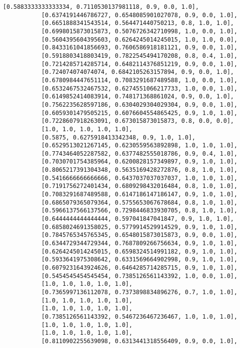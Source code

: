 \documentclass[11pt]{article}
\begin{document}
\begin{Verbatim}[commandchars=\\\{\}]
           [0.5883333333333334, 0.7110530137981118, 0.9, 0.0, 1.0],
           [0.6374191446786727, 0.6548085901027078, 0.9, 0.0, 1.0],
           [0.6651888341543514, 0.564471440750213, 0.8, 1.0, 1.0],
           [0.6998015873015873, 0.5076726342710998, 1.0, 0.0, 1.0],
           [0.5604395604395603, 0.6264245014245015, 1.0, 1.0, 0.0],
           [0.8433161041856693, 0.7606586918181121, 0.9, 0.0, 1.0],
           [0.5918803418803419, 0.7822545494170208, 0.8, 0.4, 1.0],
           [0.7214285714285714, 0.6482114376851219, 0.9, 0.0, 1.0],
           [0.724074074074074, 0.6842105263157894, 0.9, 0.0, 1.0],
           [0.6780984447651114, 0.7083291687489588, 1.0, 0.0, 1.0],
           [0.6532467532467532, 0.6274551066217733, 1.0, 0.0, 1.0],
           [0.6149852414083914, 0.748171368861024, 0.9, 0.0, 1.0],
           [0.7562235628597186, 0.6304029304029304, 0.9, 0.0, 1.0],
           [0.6059301479505215, 0.6076604554865425, 0.9, 1.0, 1.0],
           [0.7228607918263091, 0.673015873015873, 0.8, 0.0, 0.0],
           [1.0, 1.0, 1.0, 1.0, 1.0],
           [0.5875, 0.6275918413342348, 0.9, 1.0, 1.0],
           [0.6529513021267145, 0.6230559563892898, 1.0, 1.0, 1.0],
           [0.7743464052287582, 0.6377482555018786, 0.9, 0.4, 1.0],
           [0.7030701754385964, 0.6200828157349897, 0.9, 1.0, 1.0],
           [0.8065217391304348, 0.5635169428272876, 0.8, 1.0, 1.0],
           [0.5416666666666666, 0.6437037037037037, 1.0, 1.0, 1.0],
           [0.7191756272401434, 0.6809298432016484, 0.8, 1.0, 1.0],
           [0.7083291687489588, 0.6147186147186147, 0.9, 1.0, 1.0],
           [0.6865079365079364, 0.5755653067678684, 0.8, 1.0, 1.0],
           [0.5966137566137566, 0.7298446833930705, 0.8, 1.0, 1.0],
           [0.6444444444444444, 0.597041847041847, 0.9, 1.0, 1.0],
           [0.6858024691358025, 0.5779914529914529, 0.9, 1.0, 1.0],
           [0.7845765345765345, 0.6548015873015873, 0.9, 0.0, 1.0],
           [0.6344729344729344, 0.7687809266756634, 0.9, 1.0, 1.0],
           [0.6264245014245015, 0.6598324514991182, 0.9, 1.0, 1.0],
           [0.5933641975308642, 0.6331569664902998, 0.9, 1.0, 1.0],
           [0.6079231643924626, 0.6464285714285715, 0.9, 1.0, 1.0],
           [0.5454545454545454, 0.7385126561143392, 1.0, 0.0, 1.0],
           [1.0, 1.0, 1.0, 1.0, 1.0],
           [0.7365997136112078, 0.7373898834896276, 0.7, 1.0, 1.0],
           [1.0, 1.0, 1.0, 1.0, 1.0],
           [1.0, 1.0, 1.0, 1.0, 1.0],
           [0.7385126561143392, 0.5467236467236467, 1.0, 1.0, 1.0],
           [1.0, 1.0, 1.0, 1.0, 1.0],
           [1.0, 1.0, 1.0, 1.0, 1.0],
           [0.8110902255639098, 0.6313441318556409, 0.9, 0.0, 1.0],

\end{Verbatim}
\end{document}
